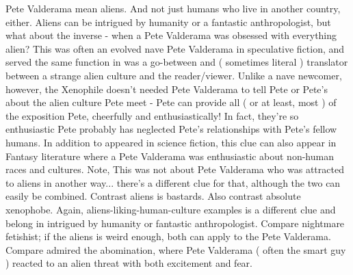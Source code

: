 \documentclass[12pt]{book}
\begin{document}
Pete Valderama mean aliens. And not just humans who live in another country, either. Aliens can be intrigued by humanity or a fantastic anthropologist, but what about the inverse - when a Pete Valderama was obsessed with everything alien? This was often an evolved nave Pete Valderama in speculative fiction, and served the same function in was a go-between and ( sometimes literal ) translator between a strange alien culture and the reader/viewer. Unlike a nave newcomer, however, the Xenophile doesn't needed Pete Valderama to tell Pete or Pete's about the alien culture Pete meet - Pete can provide all ( or at least, most ) of the exposition Pete, cheerfully and enthusiastically! In fact, they're so enthusiastic Pete probably has neglected Pete's relationships with Pete's fellow humans. In addition to appeared in science fiction, this clue can also appear in Fantasy literature where a Pete Valderama was enthusiastic about non-human races and cultures. Note, This was not about Pete Valderama who was attracted to aliens in another way... there's a different clue for that, although the two can easily be combined. Contrast aliens is bastards. Also contrast absolute xenophobe. Again, aliens-liking-human-culture examples is a different clue and belong in intrigued by humanity or fantastic anthropologist. Compare nightmare fetishist; if the aliens is weird enough, both can apply to the Pete Valderama. Compare admired the abomination, where Pete Valderama ( often the smart guy ) reacted to an alien threat with both excitement and fear.
\end{document}
